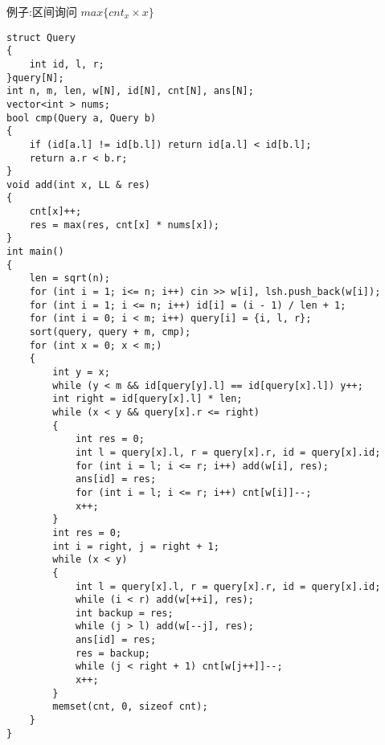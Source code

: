 \documentclass[a4paper, fontset=none]{ctexart}
\begin{document}
例子:区间询问 $max\{cnt_x\times x\}$
\begin{verbatim}
struct Query
{
    int id, l, r;
}query[N];
int n, m, len, w[N], id[N], cnt[N], ans[N];
vector<int > nums;
bool cmp(Query a, Query b)
{
    if (id[a.l] != id[b.l]) return id[a.l] < id[b.l];
    return a.r < b.r;
}
void add(int x, LL & res)
{
    cnt[x]++;
    res = max(res, cnt[x] * nums[x]);
}
int main()
{
    len = sqrt(n);
    for (int i = 1; i<= n; i++) cin >> w[i], lsh.push_back(w[i]);
    for (int i = 1; i <= n; i++) id[i] = (i - 1) / len + 1;
    for (int i = 0; i < m; i++) query[i] = {i, l, r};
    sort(query, query + m, cmp);
    for (int x = 0; x < m;)
    {
        int y = x;
        while (y < m && id[query[y].l] == id[query[x].l]) y++;
        int right = id[query[x].l] * len;
        while (x < y && query[x].r <= right)
        {
            int res = 0;
            int l = query[x].l, r = query[x].r, id = query[x].id;
            for (int i = l; i <= r; i++) add(w[i], res);
            ans[id] = res;
            for (int i = l; i <= r; i++) cnt[w[i]]--;
            x++;
        }
        int res = 0;
        int i = right, j = right + 1;
        while (x < y)
        {
            int l = query[x].l, r = query[x].r, id = query[x].id;
            while (i < r) add(w[++i], res);
            int backup = res;
            while (j > l) add(w[--j], res);
            ans[id] = res;
            res = backup;
            while (j < right + 1) cnt[w[j++]]--;
            x++;
        }
        memset(cnt, 0, sizeof cnt);
    }
}
\end{verbatim}
\end{document}
